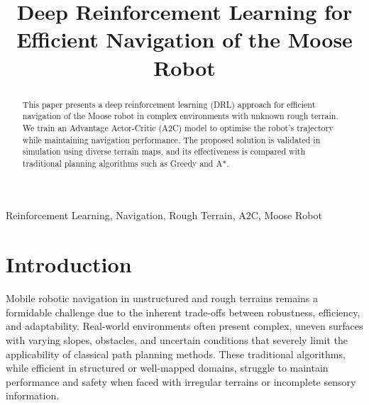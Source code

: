 \documentclass[conference]{IEEEtran}
\begin{document}
\title{Deep Reinforcement Learning for Efficient Navigation of the Moose Robot}

\author{
    \and
    \and
}


\maketitle

\begin{abstract}
This paper presents a deep reinforcement learning (DRL) approach for efficient navigation of the Moose robot in complex environments with unknown rough terrain. We train an Advantage Actor-Critic (A2C) model to optimise the robot's trajectory while maintaining navigation performance. The proposed solution is validated in simulation using diverse terrain maps, and its effectiveness is compared with traditional planning algorithms such as Greedy and A*.
\end{abstract}

\begin{IEEEkeywords}
Reinforcement Learning, Navigation, Rough Terrain, A2C, Moose Robot
\end{IEEEkeywords}


\section{Introduction}
Mobile robotic navigation in unstructured and rough terrains remains a formidable challenge due to the inherent trade-offs between robustness, efficiency, and adaptability. Real-world environments often present complex, uneven surfaces with varying slopes, obstacles, and uncertain conditions that severely limit the applicability of classical path planning methods. These traditional algorithms, while efficient in structured or well-mapped domains, struggle to maintain performance and safety when faced with irregular terrains or incomplete sensory information.
\end{document}
